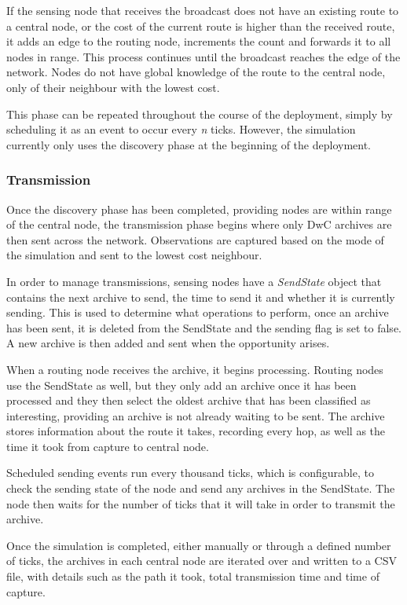 	If the sensing node that receives the broadcast does not have an existing route to a central node, or the cost of the current route is higher than the received route, it adds an edge to the routing node, increments the count and forwards it to all nodes in range. This process continues until the broadcast reaches the edge of the network. Nodes do not have global knowledge of the route to the central node, only of their neighbour with the lowest cost.
	
	This phase can be repeated throughout the course of the deployment, simply by scheduling it as an event to occur every \textit{n} ticks. However, the simulation currently only uses the discovery phase at the beginning of the deployment.
	
\subsubsection{Transmission}
	Once the discovery phase has been completed, providing nodes are within range of the central node, the transmission phase begins where only DwC archives are then sent across the network. Observations are captured based on the mode of the simulation and sent to the lowest cost neighbour.
	
	In order to manage transmissions, sensing nodes have a \textit{SendState} object that contains the next archive to send, the time to send it and whether it is currently sending. This is used to determine what operations to perform, once an archive has been sent, it is deleted from the SendState and the sending flag is set to false. A new archive is then added and sent when the opportunity arises.
	
	When a routing node receives the archive, it begins processing. Routing nodes use the SendState as well, but they only add an archive once it has been processed and they then select the oldest archive that has been classified as interesting, providing an archive is not already waiting to be sent. The archive stores information about the route it takes, recording every hop, as well as the time it took from capture to central node.
	
	Scheduled sending events run every thousand ticks, which is configurable, to check the sending state of the node and send any archives in the SendState. The node then waits for the number of ticks that it will take in order to transmit the archive.
	
	Once the simulation is completed, either manually or through a defined number of ticks, the archives in each central node are iterated over and written to a CSV file, with details such as the path it took, total transmission time and time of capture.
	
